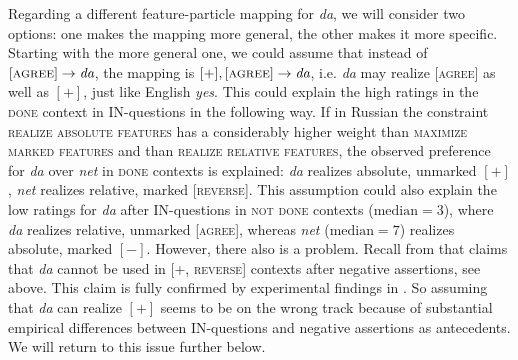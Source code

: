 \documentclass[output=paper,colorlinks,citecolor=brown]{langscibook}
\begin{document}
Regarding a different feature-particle mapping for \textit{da}, we will consider two options: one makes the mapping more general, the other makes it more specific. Starting with the more general one, we could assume that instead of $[\textsc{agree}]\rightarrow \textit{da}$, the mapping is $[+],[\textsc{agree}]\rightarrow\textit{da}$, i.e. \textit{da} may realize [\textsc{agree}] as well as $[+]$, just like English \textit{yes}. This could explain the high ratings in the \textsc{done} context in IN-questions in the following way. If in Russian the constraint \textsc{realize absolute features} has a considerably higher weight than \textsc{maximize marked features} and than \textsc{realize relative features}, the observed preference for \textit{da} over \textit{net} in \textsc{done} contexts is explained: \textit{da} realizes absolute, unmarked $[+]$, \textit{net} realizes relative, marked [\textsc{reverse}]. This assumption could also explain the low ratings for \textit{da} after IN-questions in \textsc{not done} contexts ($\text{median}=3$), where \textit{da} realizes relative, unmarked [\textsc{agree}], whereas \textit{net} ($\text{median}=7$) realizes absolute, marked $[-]$. However, there also is a problem. Recall from  that \citet{Esipova2021} claims that \textit{da} cannot be used in [+, \textsc{reverse}] contexts after negative assertions, see  above. This claim is fully confirmed by experimental findings in \citet{ReppGeist2022}. So assuming that \textit{da} can realize $[+]$ seems to be on the wrong track because of substantial empirical differences between IN-questions and negative assertions as antecedents. We will return to this issue further below. 
\end{document}
